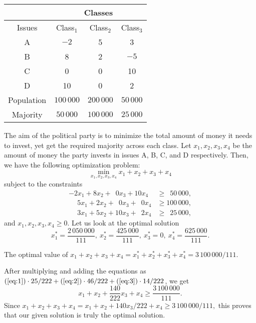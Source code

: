 \documentclass[twoside]{article}
\begin{document}
\begin{table}[htbp]
    \centering
    \begin{tabular}{|c|c|c|c|}
        \hline
        \multicolumn{1}{|r|}{} & \multicolumn{3}{c|}{Classes} \\
        \hline
        Issues & Class$_1$ & Class$_2$ & Class$_3$  \\
        \hline
        A & $-2$ & 5 & 3 \\
        \hline
        B &  8   & 2 & $-5$ \\
        \hline
        C &  0   & 0 & 10 \\
        \hline
        D & 10   & 0 & 2 \\
        \hline
        Population & $100\,000$ & $200\,000$ & $50\,000$\\
        \hline
        Majority   &  $50\,000$ & $100\,000$ & $25\,000$\\
        \hline
    \end{tabular}
    \label{tab:election_grid}
    \caption{} %
\end{table}

The aim of the political party is to minimize the total amount of money it needs
to invest, yet get the required majority across each class. Let $x_1, x_2, x_3,
x_4$ be the amount of money the party invests in issues A, B, C, and D
respectively. Then, we have the following optimization problem: \[
    \min_{x_1, x_2, x_3, x_4} x_1 + x_2 + x_3 + x_4
\] subject to the constraints
\begin{align}
    -2x_1 + 8x_2 +  \phantom{1}0x_3 + 10x_4 &\geq \phantom{1}50\,000,  \label{eq:1} \\
    \phantom{-}5x_1 + 2x_2 +  \phantom{1}0x_3 +  \phantom{1}0x_4 &\geq 100\,000, \label{eq:2} \\
    \phantom{-}3x_1 + 5x_2 + 10x_3 +  \phantom{1}2x_4 &\geq \phantom{1}25\,000,  \label{eq:3}
\end{align}
and $x_1, x_2, x_3, x_4 \geq 0.$ Let us look at the optimal solution \[
    x_1^* = \frac{2\,050\,000}{111},\ x_2^* = \frac{425\,000}{111},\
    x_3^* = 0,\ x_4^* = \frac{625\,000}{111}.
\]

The optimal value of
$x_1 + x_2 + x_3 + x_4 = x_1^* + x_2^* + x_3^* + x_4^* = 3\,100\,000/111.$

After multiplying and adding the equations as
$(\ref{eq:1}) \cdot 25/222 + (\ref{eq:2}) \cdot 46/222 + (\ref{eq:3}) \cdot 14/222$,
we get \[
        x_1 + x_2 + \frac{140}{222}x_3 + x_4 \geq \frac{3\,100\,000}{111}.
\] Since
$x_1 + x_2 + x_3 + x_4 = x_1 + x_2 + 140 x_3/222 + x_4 \geq 3\,100\,000/111,$
this proves that our given solution is truly the optimal solution.
\end{document}
